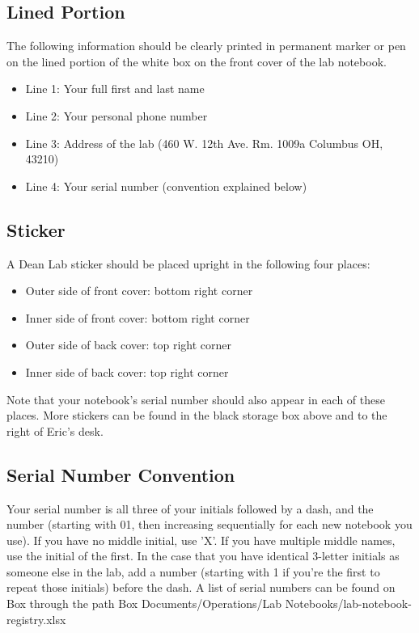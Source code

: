 \documentclass[11pt, oneside]{article}   	%
\begin{document}
\normalsize									
\subsection[Lined Portion]{Lined Portion}

The following information should be clearly printed in permanent marker or pen on the lined portion of the white box on the front cover of the lab notebook.
\begin{itemize}
	\item Line 1: Your full first and last name
	\item Line 2: Your personal phone number
	\item Line 3: Address of the lab (460 W. 12th Ave. Rm. 1009a Columbus OH, 43210)
	\item Line 4: Your serial number (convention explained below)
\end{itemize}

\subsection[Sticker]{Sticker}	

A Dean Lab sticker should be placed upright in the following four places:
\begin{itemize}
	\item Outer side of front cover: bottom right corner
	\item Inner side of front cover: bottom right corner
	\item Outer side of back cover: top right corner
	\item Inner side of back cover: top right corner
\end{itemize}
	
Note that your notebook's serial number should also appear in each of these places. More stickers can be found in the black storage box above and to the right of Eric's desk. 

\subsection[Serial Number Convention]{Serial Number Convention}		

Your serial number is all three of your initials followed by a dash, and the number (starting with 01, then increasing sequentially for each new notebook you use). If you have no middle initial, use 'X'. If you have multiple middle names, use the initial of the first. In the case that you have identical 3-letter initials as someone else in the lab, add a number (starting with 1 if you're the first to repeat those initials) before the dash. A list of serial numbers can be found on Box through the path Box Documents/Operations/Lab Notebooks/lab-notebook-registry.xlsx
\end{document}
